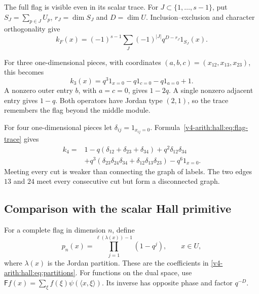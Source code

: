 The full flag is visible even in its scalar trace. For
$J\subset\{1,\ldots,s-1\}$, put
$S_J=\sum_{p\in J}U_p$, $r_J=\dim S_J$ and $D=\dim U$.
Inclusion--exclusion and character orthogonality give
\begin{equation}\label{v4-arith:hall:eq:flag-trace}
 k_F(x)=(-1)^{s-1}\sum_J(-1)^{|J|}q^{D-r_J}1_{S_J}(x).
\end{equation}

For three one-dimensional pieces, with coordinates
$(a,b,c)=(x_{12},x_{13},x_{23})$, this becomes
\[
 k_3(x)=q^3 1_{x=0}-q1_{c=0}-q1_{a=0}+1.
\]
A nonzero outer entry $b$, with $a=c=0$, gives $1-2q$.
A single nonzero adjacent entry gives $1-q$.
Both operators have Jordan type $(2,1)$, so the trace remembers
the flag beyond the middle module.

For four one-dimensional pieces let $\delta_{ij}=1_{x_{ij}=0}$.
Formula~\eqref{v4-arith:hall:eq:flag-trace} gives
\[
 \begin{split}
 k_4={}&1-q(\delta_{12}+\delta_{23}+\delta_{34})
        +q^2\delta_{12}\delta_{34}\\
 &+q^3(\delta_{23}\delta_{24}\delta_{34}
          +\delta_{12}\delta_{13}\delta_{23})-q^6 1_{x=0}.
 \end{split}
\]
Meeting every cut is weaker than connecting the graph of labels.
The two edges $13$ and $24$ meet every consecutive cut but
form a disconnected graph.

\subsection{Comparison with the scalar Hall primitive}

For a complete flag in dimension $n$, define
\[
 p_n(x)=\prod_{j=1}^{\ell(\lambda(x))-1}(1-q^j),\qquad x\in U,
\]
where $\lambda(x)$ is the Jordan partition.
These are the coefficients in \eqref{v4-arith:hall:eq:partitions}.
For functions on the dual space, use
$\mathsf Ff(x)=\sum_\xi f(\xi)\psi(\langle x,\xi\rangle)$.
Its inverse has opposite phase and factor $q^{-D}$.

